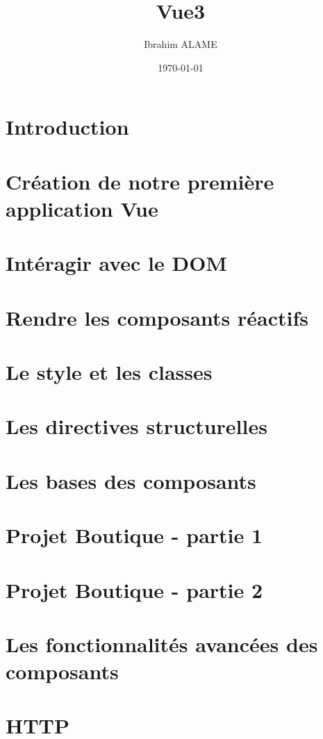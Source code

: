 \documentclass[a4paper]{book}
\title{Vue3}
\author{Ibrahim ALAME}
\date{\today}
\begin{document}
 
\maketitle

    \chapter{Introduction}
	

    \chapter{Création de notre première application Vue}
    
	\chapter{Intéragir avec le DOM}
		
	\chapter{Rendre les composants réactifs}
	
	\chapter{Le style et les classes}
	
	\chapter{Les directives structurelles}
	
	\chapter{Les bases des composants}
	
	\chapter{Projet Boutique - partie 1}
	
	\chapter{Projet Boutique - partie 2}
	
	\chapter{Les fonctionnalités avancées des composants}
	
	\chapter{HTTP}
	
\end{document}
